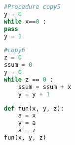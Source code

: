 \documentclass[]{article}
\begin{document}
\begin{lstlisting}[language=Python, caption=Python version of copy5 example in \cite{denning}. goal: information flow from x to y, label={lst:copy5} ]
#Procedure copy5
y = 0
while x==0 :
pass
y = 1
\end{lstlisting}
\begin{lstlisting}[language=Python, caption=Python version of copy6 example in \cite{denning}. goal: information flow from x to y, label={lst:copy6} ]
#copy6
z = 0
ssum = 0
y = 0
while z == 0 :
	ssum = ssum + x       
	y = y + 1
\end{lstlisting}
\begin{lstlisting}[language=Python, caption=Python version of dynamic label example in \cite{denning}. goal: information flow from x to y, label={lst:dynamic} ]
def fun(x, y, z):
	a = x
	y = a
	a = z
fun(x, y, z)
\end{lstlisting}
\end{document}
